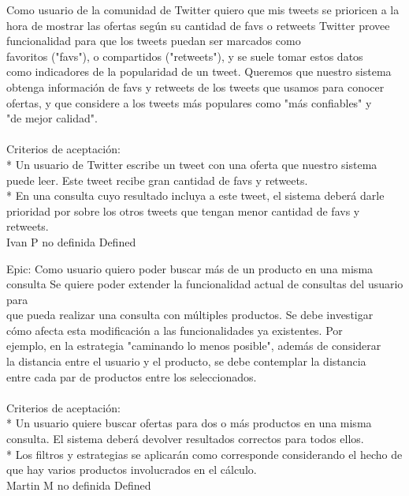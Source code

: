 	{Como usuario de la comunidad de Twitter quiero que mis tweets se prioricen a la hora de mostrar las ofertas según su cantidad de favs o retweets} %
	{Twitter provee funcionalidad para que los tweets puedan ser marcados como\\
favoritos ("favs"), o compartidos ("retweets"), y se suele tomar estos datos\\
como indicadores de la popularidad de un tweet. Queremos que nuestro sistema\\
obtenga información de favs y retweets de los tweets que usamos para conocer\\
ofertas, y que considere a los tweets más populares como "más confiables" y\\
"de mejor calidad".\\
  \\
Criterios de aceptación:\\
* Un usuario de Twitter escribe un tweet con una oferta que nuestro sistema puede leer. Este tweet recibe gran cantidad de favs y retweets.  \\
* En una consulta cuyo resultado incluya a este tweet, el sistema deberá darle prioridad por sobre los otros tweets que tengan menor cantidad de favs y retweets.\\
} %
	{} %
	{} %
	{Ivan P} %
	{no definida} %
	{Defined} %


\vspace{20pt}

	{Epic: Como usuario quiero poder buscar más de un producto en una misma consulta} %
	{Se quiere poder extender la funcionalidad actual de consultas del usuario para\\
que pueda realizar una consulta con múltiples productos. Se debe investigar\\
cómo afecta esta modificación a las funcionalidades ya existentes. Por\\
ejemplo, en la estrategia "caminando lo menos posible", además de considerar\\
la distancia entre el usuario y el producto, se debe contemplar la distancia\\
entre cada par de productos entre los seleccionados.\\
  \\
Criterios de aceptación:\\
* Un usuario quiere buscar ofertas para dos o más productos en una misma consulta. El sistema deberá devolver resultados correctos para todos ellos.  \\
* Los filtros y estrategias se aplicarán como corresponde considerando el hecho de que hay varios productos involucrados en el cálculo.\\
} %
	{} %
	{} %
	{Martin M} %
	{no definida} %
	{Defined} %


\vspace{20pt}

